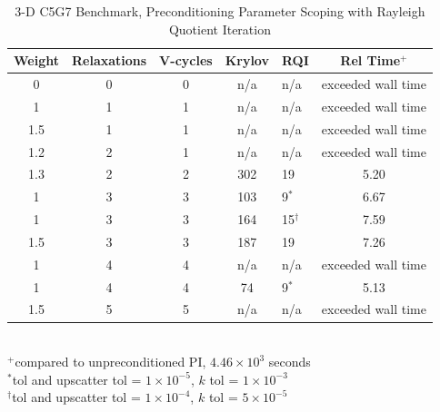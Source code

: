 \begin{table}[!h]
\caption{3-D C5G7 Benchmark, Preconditioning Parameter Scoping with Rayleigh Quotient Iteration}
\begin{center}
\begin{tabular}{| c | c | c | c | l | c |}
\hline
Weight & Relaxations & V-cycles & Krylov & RQI & Rel Time$^{+}$ \\[0.5ex]
\hline
0    & 0 & 0 & n/a     & n/a          & exceeded wall time \\
1    & 1 & 1 & n/a     & n/a          & exceeded wall time \\
1.5 & 1 & 1 & n/a     & n/a          & exceeded wall time \\
1.2 & 2 & 1 & n/a     & n/a          & exceeded wall time \\
1.3 & 2 & 2 & 302    & 19           & 5.20 \\ %
1    & 3 & 3 & 103    & 9$^{*}$    & 6.67 \\ %
1    & 3 & 3 & 164    & 15$^{\dag}$ & 7.59 \\ %
1.5 & 3 & 3 & 187    & 19           & 7.26 \\ %
1    & 4 & 4 & n/a     & n/a          & exceeded wall time \\
1    & 4 & 4 & 74     & 9$^{*}$    & 5.13 \\ %
1.5 & 5 & 5 & n/a     & n/a          & exceeded wall time \\
\hline 
\end{tabular}\\
$^{+}$compared to unpreconditioned PI, $4.46 \times 10^{3}$ seconds\\
$^{*}$tol and upscatter tol = $1 \times 10^{-5}$, $k$ tol = $1 \times 10^{-3}$\\
$^{\dag}$tol and upscatter tol = $1 \times 10^{-4}$, $k$ tol = $5 \times 10^{-5}$
\end{center}
\label{table:3-D c5g7 rqi}
\end{table}  

